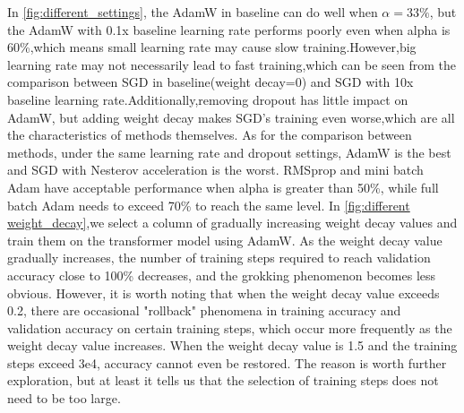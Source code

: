 In \cref{fig:different_settings}, the AdamW in baseline can do well when $\alpha = 33\%$, but the AdamW with 0.1x baseline learning rate performs poorly even when alpha is 60\%,which means small learning rate may cause slow training.However,big learning rate may not necessarily lead to fast training,which can be seen from the comparison between SGD in baseline(weight decay=0) and SGD with 10x baseline learning rate.Additionally,removing dropout has little impact on AdamW, but adding weight decay makes SGD's training even worse,which are all the characteristics of methods themselves.
As for the comparison between methods, under the same learning rate and dropout settings, AdamW is the best and SGD with Nesterov acceleration is the worst. RMSprop and mini batch Adam have acceptable performance when alpha is greater than 50\%, while full batch Adam needs to exceed 70\% to reach the same level.
In \cref{fig:different weight_decay},we select a column of gradually increasing weight decay values and train them on the transformer model using AdamW. As the weight decay value gradually increases, the number of training steps required to reach validation accuracy close to 100\% decreases, and the grokking phenomenon becomes less obvious. However, it is worth noting that when the weight decay value exceeds 0.2, there are occasional "rollback" phenomena in training accuracy and validation accuracy on certain training steps, which occur more frequently as the weight decay value increases. When the weight decay value is 1.5 and the training steps exceed 3e4, accuracy cannot even be restored. The reason is worth further exploration, but at least it tells us that the selection of training steps does not need to be too large.
